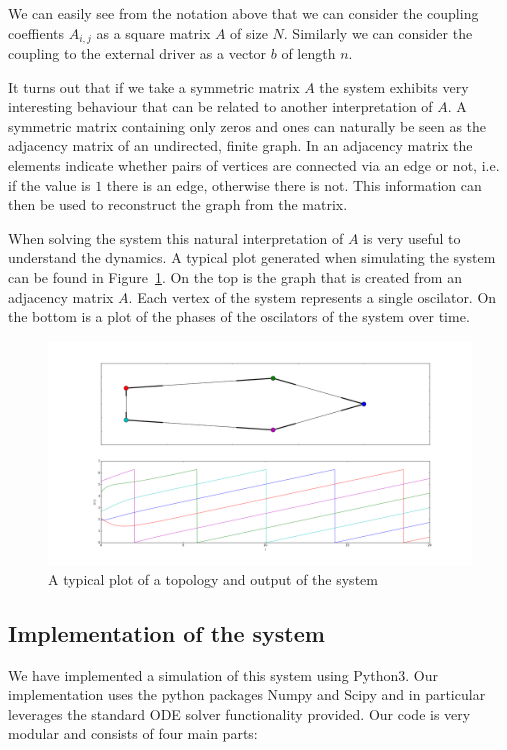 We can easily see from the notation above that we can consider the coupling coeffients $A_{i, j}$ as a square matrix $A$ of size $N$. Similarly we can consider the coupling to the external driver as a vector $b$ of length $n$. 

It turns out that if we take a symmetric matrix $A$ the system exhibits very interesting behaviour that can be related to another interpretation of $A$. A symmetric matrix containing only zeros and ones can naturally be seen as the adjacency matrix of an undirected, finite graph. In an adjacency matrix the elements indicate whether pairs of vertices are connected via an edge or not, i.e. if the value is $1$ there is an edge, otherwise there is not. This information can then be used to reconstruct the graph from the matrix. 

When solving the system this natural interpretation of $A$ is very useful to understand the dynamics. A typical plot generated when simulating the system can be found in Figure~\ref{fig:adjacencymatrix}. On the top is the graph that is created from an adjacency matrix $A$. Each vertex of the system represents a single oscilator. On the bottom is a plot of the phases of the oscilators of the system over time. 

\begin{figure}[h]
\centering
\includegraphics[width=\textwidth]{imgs/examplefigure}
\caption{A typical plot of a topology and output of the system}
\label{fig:adjacencymatrix}
\end{figure}

\subsection{Implementation of the system}
We have implemented a simulation of this system using Python3. Our implementation uses the python packages Numpy and Scipy and in particular leverages the standard ODE solver functionality provided. Our code is very modular and consists of four main parts: 

